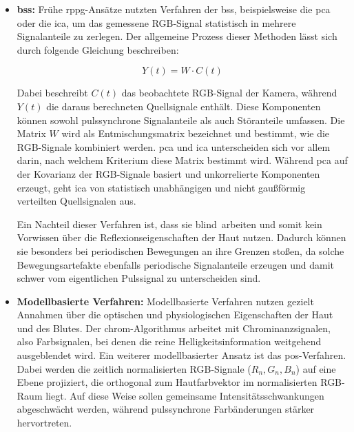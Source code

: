 \begin{itemize}
    \item \textbf{\ac{bss}:} Frühe \ac{rppg}-Ansätze nutzten Verfahren der \ac{bss}, beispielsweise die \ac{pca} oder die \ac{ica}, um das gemessene RGB-Signal statistisch in mehrere Signalanteile zu zerlegen. Der allgemeine Prozess dieser Methoden lässt sich durch folgende Gleichung beschreiben:
    
    \begin{equation}
        Y(t) = W \cdot C(t)
    \end{equation}

    Dabei beschreibt $C(t)$ das beobachtete RGB-Signal der Kamera, während $Y(t)$ die daraus berechneten Quellsignale enthält. Diese Komponenten können sowohl pulssynchrone Signalanteile als auch Störanteile umfassen. Die Matrix $W$ wird als Entmischungsmatrix bezeichnet und bestimmt, wie die RGB-Signale kombiniert werden. \ac{pca} und \ac{ica} unterscheiden sich vor allem darin, nach welchem Kriterium diese Matrix bestimmt wird. Während \ac{pca} auf der Kovarianz der RGB-Signale basiert und unkorrelierte Komponenten erzeugt, geht \ac{ica} von statistisch unabhängigen und nicht gaußförmig verteilten Quellsignalen aus.
    
    Ein Nachteil dieser Verfahren ist, dass sie \glqq blind\grqq\ arbeiten und somit kein Vorwissen über die Reflexionseigenschaften der Haut nutzen. Dadurch können sie besonders bei periodischen Bewegungen an ihre Grenzen stoßen, da solche Bewegungsartefakte ebenfalls periodische Signalanteile erzeugen und damit schwer vom eigentlichen Pulssignal zu unterscheiden sind.
    
    \item \textbf{Modellbasierte Verfahren:} Modellbasierte Verfahren nutzen gezielt Annahmen über die optischen und physiologischen Eigenschaften der Haut und des Blutes. Der \ac{chrom}-Algorithmus arbeitet mit Chrominanzsignalen, also Farbsignalen, bei denen die reine Helligkeitsinformation weitgehend ausgeblendet wird. Ein weiterer modellbasierter Ansatz ist das \ac{pos}-Verfahren. Dabei werden die zeitlich normalisierten RGB-Signale ($R_n, G_n, B_n$) auf eine Ebene projiziert, die orthogonal zum Hautfarbvektor im normalisierten RGB-Raum liegt. Auf diese Weise sollen gemeinsame Intensitätsschwankungen abgeschwächt werden, während pulssynchrone Farbänderungen stärker hervortreten.
    

\end{itemize}
